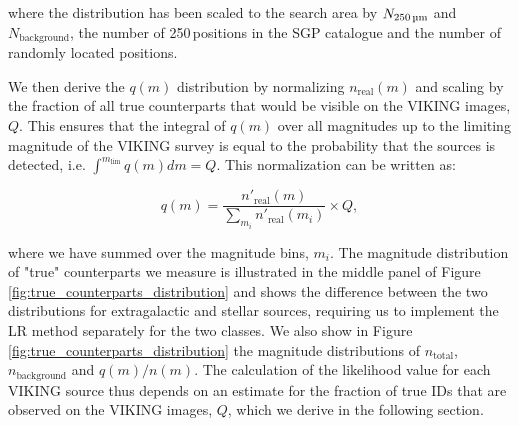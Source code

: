 where the distribution has been scaled to the search area by $N_{\textrm{250\,\micron}}$ and $N_{\textrm{background}}$, the number of 250\,\micron positions in the SGP catalogue and the number of randomly located positions.

We then derive the $q(m)$ distribution by normalizing $n_{\textrm{real}}(m)$ and scaling by the fraction of all true counterparts that would be visible on the VIKING images, $Q$. This ensures that the integral of $q(m)$ over all magnitudes up to the limiting magnitude of the VIKING survey is equal to the probability that the sources is detected, i.e. $\int^{m_{\textrm{lim}}} q(m)dm = Q$. This normalization can be written as:

\begin{equation}
\label{eq:true_counterparts_distribution}
    q(m) = \frac{n'_{\textrm{real}}(m)}{\sum_{m_i}n'_{\textrm{real}}(m_i)}\times Q,
\end{equation}

where we have summed over the magnitude bins, $m_i$. The magnitude distribution of "true" counterparts we measure is illustrated in the middle panel of Figure \ref{fig:true_counterparts_distribution} and shows the difference between the two distributions for extragalactic and stellar sources, requiring us to implement the LR method separately for the two classes. We also show in Figure \ref{fig:true_counterparts_distribution} the magnitude distributions of $n_{\textrm{total}}$, $n_{\textrm{background}}$ and $q(m)/n(m)$. The calculation of the likelihood value for each VIKING source thus depends on an estimate for the fraction of true IDs that are observed on the VIKING images, $Q$, which we derive in the following section.

